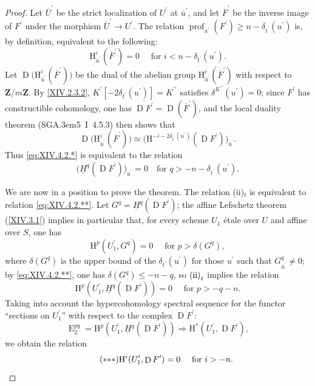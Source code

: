 \documentclass[11pt,a4paper,oneside]{book}
\providecommand{\pageoriginale}{%
  \refstepcounter{pageoriginal}%
  \marginpar{\raggedright\footnotesize\bfseries\thepageoriginal}%
  \xspace}
\providecommand{\og}{``}
\providecommand{\fg}{''\xspace}
\providecommand{\SGA}{\textup{SGA}\kern.3em}
\providecommand{\ZZ}{\mathbf Z}
\DeclareMathOperator{\E}{E}
\DeclareMathOperator{\D}{D}
\providecommand{\prof}{\operatorname{prof}}
\renewcommand{\H}{\mathrm H}
\providecommand{\To}{\Longrightarrow}
\theoremstyle{plain}
\theoremstyle{definition}
\theoremstyle{remark}
\renewcommand{\Ref}[1]{\textup{\ref{#1}}}
\begin{document}
\begin{proof}
Let $\overline{U}^{\prime}$ be the strict localization of $U^{\prime}$ at $\overline{u}^{\prime}$, and let $\overline{F}^{\prime}$ be the inverse image of $F^{\prime}$ under the morphism $\overline{U}^{\prime}\to U^{\prime}$. The relation $\prof_{u^{\prime}}(F^{\prime})\geq n-\delta_{t^{\prime}}(u^{\prime})$ is, by definition, equivalent to the following:
\begin{equation*} \label{eq:XIV.4.2.*} \tag{$*$} {\H_{\overline{u}^{\prime}}^{i}(\overline{F}^{\prime})=0\quad\textrm{ for }i<n-\delta_{t^{\prime}}(u^{\prime}).}
\end{equation*}
Let $\D\big(\H_{\overline{u}^{\prime}}^{i}(\overline{F}^{\prime})\big)$ be the dual of the abelian group $\H_{\overline{u}^{\prime}}^{i}(\overline{F}^{\prime})$ with respect to $\ZZ/m\ZZ$. By \Ref{XIV.2.3.2}, $K^{\prime}[-2\delta_{t^{\prime}}(u^{\prime})]=K^{\prime\prime}$ satisfies $\delta^{K^{\prime\prime}}(u^{\prime})=0$; since $F^{\prime}$ has constructible cohomology, one has $\overline{\D F^{\prime}}=\D(\overline{F}^{\prime})$, and the local\pageoriginale duality theorem (\SGA 5~I~4.5.3) then shows that
$$
\D\big(\H_{\overline{u}^{\prime}}^{i}(\overline{F}^{\prime})\big) \simeq\big(\H^{-i-2\delta_{t^{\prime}}(u^{\prime})}(\D F^{\prime})\big)_{\overline{u}^{\prime}}.
$$
Thus \eqref{eq:XIV.4.2.*} is equivalent to the relation
\begin{equation*} \label{eq:XIV.4.2.**} \tag{$**$}
\big(\underline{H}^{q}(\D F^{\prime})\big)_{\overline{u}^{\prime}}=0\quad\text{for }q>-n-\delta_{t^{\prime}}(u^{\prime}).
\end{equation*}

We are now in a position to prove the theorem. The relation \textup{(ii)}$_{t}$ is equivalent to relation \eqref{eq:XIV.4.2.**}. Let $G^{q}=\underline{H}^{q}(\D F^{\prime})$; the affine Lefschetz theorem (\Ref{XIV.3.1}) implies in particular that, for every scheme $U_{1}$ étale over $U$ and affine over $S$, one has
$$
\H^{p}(U_{1}^{\prime}, G^{q})=0\quad\textrm{ for }p>\delta(G^{q}),
$$
where $\delta(G^{q})$ is the upper bound of the $\delta_{t^{\prime}}(u^{\prime})$ for those $u^{\prime}$ such that $G_{\overline{u}^{\prime}}^{q}\neq 0$; by \eqref{eq:XIV.4.2.**}, one has $\delta(G^{q})\leq -n-q$, so $\textup{(ii)}_{t}$ implies the relation
$$
\H^{p}(U_{1}^{\prime}, \underline{H}^{q}(\D F^{\prime}))=0\quad\textrm{ for }p>-q-n.
$$
Taking into account the hypercohomology spectral sequence for the functor \og sections on $U_{1}^{\prime}$\fg with respect to the complex $\D F^{\prime}$:
$$
\E_{2}^{pq}=\H^{p}(U_{1}^{\prime}, \underline{H}^{q}(\D F^{\prime}))\To\H^{\ast}(U_{1}^{\prime}, \D F^{\prime}),
$$
we obtain the relation
\begin{equation*} \label{eq:XIV.4.2.***} \tag{${*}{*}{*}$}
\H^{i}(U_{1}^{\prime}, \D F^{\prime})=0\quad\textrm{ for }i>-n.
\end{equation*}


\end{proof}
\end{document}
